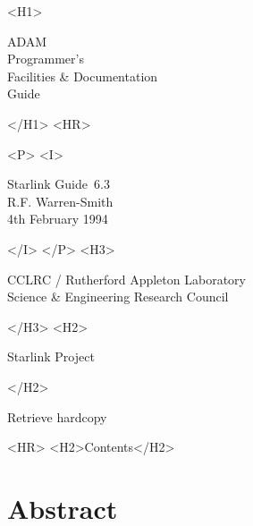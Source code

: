 \documentclass[twoside,11pt]{article}
\newcommand{\stardoccategory}  {Starlink Guide}
\newcommand{\stardocnumber}    {6.3}
\newcommand{\stardocauthors}   {R.F. Warren-Smith}
\newcommand{\stardocdate}      {4th February 1994}
\newcommand{\stardoctitle}     {ADAM\\[0.75ex]
                                Programmer's\\
                                Facilities \& Documentation\\
                                Guide}
\newcommand{\htmladdnormallink}[2]{#1}
\newcommand{\htmladdimg}[1]{}
\newcommand{\htmlref}[2]{#1}
\newcommand{\htmladdtonavigation}[1]{}
\newcommand{\xlabel}[1]{}
\newcommand{\latexonlytoc}[0]{\tableofcontents}
\begin{document}
\begin{htmlonly}
   \xlabel{}
   \begin{rawhtml} <H1> \end{rawhtml}
      \stardoctitle
   \begin{rawhtml} </H1> <HR> \end{rawhtml}


   \begin{rawhtml} <P> <I> \end{rawhtml}
   \stardoccategory\ \stardocnumber \\
   \stardocauthors \\
   \stardocdate
   \begin{rawhtml} </I> </P> <H3> \end{rawhtml}
      \htmladdnormallink{CCLRC}{http://www.cclrc.ac.uk} /
      \htmladdnormallink{Rutherford Appleton Laboratory}
                        {http://www.cclrc.ac.uk/ral} \\
      \htmladdnormallink{Science \& Engineering Research Council}
                        {http://www.stfc.ac.uk} \\
   \begin{rawhtml} </H3> <H2> \end{rawhtml}
      \htmladdnormallink{Starlink Project}{http://star-www.rl.ac.uk/}
   \begin{rawhtml} </H2> \end{rawhtml}
   \htmladdnormallink{\htmladdimg{source.gif} Retrieve hardcopy}
      {http://star-www.rl.ac.uk/cgi-bin/hcserver?\stardocsource}\\

  \label{stardoccontents}
  \begin{rawhtml} 
    <HR>
    <H2>Contents</H2>
  \end{rawhtml}
  \newcommand{\latexonlytoc}[0]{}
  \htmladdtonavigation{\htmlref{\htmladdimg{contents_motif.gif}}
        {stardoccontents}}

  \section{\xlabel{abstract}Abstract}
\end{htmlonly}
\end{document}
